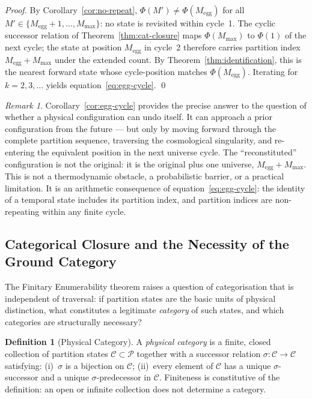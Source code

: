 \documentclass[twocolumn,10pt,a4paper]{article}
\theoremstyle{thmstyle}
\theoremstyle{definition}
\newtheorem{definition}[theorem]{Definition}
\theoremstyle{remark}
\newtheorem{remark}[theorem]{Remark}
\newcommand{\Parts}{\mathcal{P}}
\newcommand{\Mmax}{M_{\max}}
\newcommand{\PhiMap}{\varPhi}
\begin{document}
\begin{proof}
By Corollary~\ref{cor:no-repeat}, $\PhiMap(M') \neq \PhiMap(M_{\mathrm{egg}})$ for all $M' \in \{M_{\mathrm{egg}}+1, \ldots, \Mmax\}$: no state is revisited within cycle~1. The cyclic successor relation of Theorem~\ref{thm:cat-closure} maps $\PhiMap(\Mmax)$ to $\PhiMap(1)$ of the next cycle; the state at position $M_{\mathrm{egg}}$ in cycle~2 therefore carries partition index $M_{\mathrm{egg}} + \Mmax$ under the extended count. By Theorem~\ref{thm:identification}, this is the nearest forward state whose cycle-position matches $\PhiMap(M_{\mathrm{egg}})$. Iterating for $k = 2, 3, \ldots$ yields equation~\eqref{eq:egg-cycle}. \qed
\end{proof}

\begin{remark}
Corollary~\ref{cor:egg-cycle} provides the precise answer to the question of whether a physical configuration can undo itself. It can approach a prior configuration from the future --- but only by moving forward through the complete partition sequence, traversing the cosmological singularity, and re-entering the equivalent position in the next universe cycle. The ``reconstituted'' configuration is not the original: it is the original plus one universe, $M_{\mathrm{egg}} + \Mmax$. This is not a thermodynamic obstacle, a probabilistic barrier, or a practical limitation. It is an arithmetic consequence of equation~\eqref{eq:egg-cycle}: the identity of a temporal state includes its partition index, and partition indices are non-repeating within any finite cycle.
\end{remark}

\subsection{Categorical Closure and the Necessity of the Ground Category}
\label{sec:cat-closure}

The Finitary Enumerability theorem raises a question of categorisation that is independent of traversal: if partition states are the basic units of physical distinction, what constitutes a legitimate \emph{category} of such states, and which categories are structurally necessary?

\begin{definition}[Physical Category]
\label{def:category}
A \emph{physical category} is a finite, closed collection of partition states $\mathcal{C} \subset \Parts$ together with a successor relation $\sigma\colon \mathcal{C} \to \mathcal{C}$ satisfying: (i)~$\sigma$ is a bijection on $\mathcal{C}$; (ii)~every element of $\mathcal{C}$ has a unique $\sigma$-successor and a unique $\sigma$-predecessor in $\mathcal{C}$. Finiteness is constitutive of the definition: an open or infinite collection does not determine a category.
\end{definition}
\end{document}
